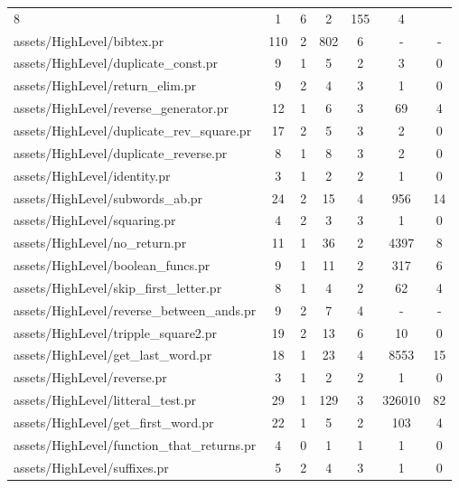 \begin{tabular}{|l|c|c|c|c|c|c|}
        8 & 1 &
         6 & 2  &
         155 & 4  \\
            assets/HighLevel/bibtex.pr &
        110 & 2 &
         802 & 6  &
         - & -  \\
            assets/HighLevel/duplicate\_const.pr &
        9 & 1 &
         5 & 2  &
         3 & 0  \\
            assets/HighLevel/return\_elim.pr &
        9 & 2 &
         4 & 3  &
         1 & 0  \\
            assets/HighLevel/reverse\_generator.pr &
        12 & 1 &
         6 & 3  &
         69 & 4  \\
            assets/HighLevel/duplicate\_rev\_square.pr &
        17 & 2 &
         5 & 3  &
         2 & 0  \\
            assets/HighLevel/duplicate\_reverse.pr &
        8 & 1 &
         8 & 3  &
         2 & 0  \\
            assets/HighLevel/identity.pr &
        3 & 1 &
         2 & 2  &
         1 & 0  \\
            assets/HighLevel/subwords\_ab.pr &
        24 & 2 &
         15 & 4  &
         956 & 14  \\
            assets/HighLevel/squaring.pr &
        4 & 2 &
         3 & 3  &
         1 & 0  \\
            assets/HighLevel/no\_return.pr &
        11 & 1 &
         36 & 2  &
         4397 & 8  \\
            assets/HighLevel/boolean\_funcs.pr &
        9 & 1 &
         11 & 2  &
         317 & 6  \\
            assets/HighLevel/skip\_first\_letter.pr &
        8 & 1 &
         4 & 2  &
         62 & 4  \\
            assets/HighLevel/reverse\_between\_ands.pr &
        9 & 2 &
         7 & 4  &
         - & -  \\
            assets/HighLevel/tripple\_square2.pr &
        19 & 2 &
         13 & 6  &
         10 & 0  \\
            assets/HighLevel/get\_last\_word.pr &
        18 & 1 &
         23 & 4  &
         8553 & 15  \\
            assets/HighLevel/reverse.pr &
        3 & 1 &
         2 & 2  &
         1 & 0  \\
            assets/HighLevel/litteral\_test.pr &
        29 & 1 &
         129 & 3  &
         326010 & 82  \\
            assets/HighLevel/get\_first\_word.pr &
        22 & 1 &
         5 & 2  &
         103 & 4  \\
            assets/HighLevel/function\_that\_returns.pr &
        4 & 0 &
         1 & 1  &
         1 & 0  \\
            assets/HighLevel/suffixes.pr &
        5 & 2 &
         4 & 3  &
         1 & 0  \\
        \bottomrule
\end{tabular}

